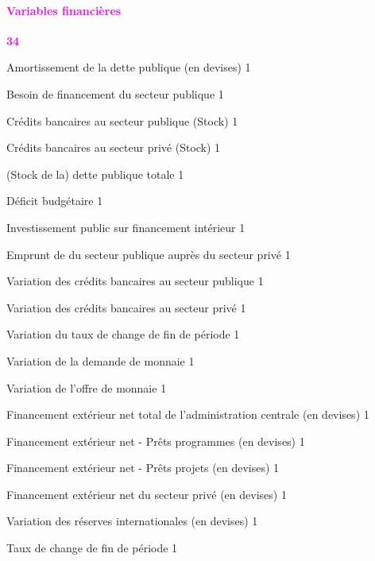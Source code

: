 \documentclass[11pt,a4paper]{article}
\newcommand{\AMORTG}{\mathit{AMORTG}}
\newcommand{\BG}{\mathit{BG}}
\newcommand{\BRG}{\mathit{BRG}}
\newcommand{\DCG}{\mathit{DCG}}
\newcommand{\DCP}{\mathit{DCP}}
\newcommand{\DEBTG}{\mathit{DEBTG}}
\newcommand{\DEFG}{\mathit{DEFG}}
\newcommand{\DINVG}{\mathit{DINVG}}
\newcommand{\ER}{\mathit{ER}}
\newcommand{\MD}{\mathit{MD}}
\newcommand{\MS}{\mathit{MS}}
\newcommand{\NFDG}{\mathit{NFDG}}
\newcommand{\NFDP}{\mathit{NFDP}}
\newcommand{\RES}{\mathit{RES}}
\newcommand{\redparagraph}[1]{\paragraph*{\large\textcolor{Fuchsia}{#1}}}
\begin{document}
	\redparagraph{Variables financières}\hfill \textcolor{Fuchsia}{\textbf{34}} 
	\begin{description}[leftmargin=!,labelwidth=\widthof{\bfseries AAAAAAAA},parsep=9.7pt]
		\item[$\AMORTG$]          Amortissement de la dette publique (en devises)	\hfill 1
		\item[$\BRG$]             Besoin de financement du secteur publique	\hfill 1
		\item[$\DCG$]             Crédits bancaires au secteur publique (Stock)	\hfill 1
		\item[$\DCP$]             Crédits bancaires au secteur privé (Stock)	\hfill 1
		\item[$\DEBTG$]           (Stock de la) dette publique totale	\hfill 1
		\item[$\DEFG$]            Déficit budgétaire	\hfill 1
		\item[$\DINVG$]           Investissement public sur financement intérieur	\hfill 1
		\item[$\Delta\BG$]            Emprunt de du secteur publique auprès du secteur privé	\hfill 1
		\item[$\Delta\DCG$]           Variation des crédits bancaires au secteur publique	\hfill 1
		\item[$\Delta\DCP$]          Variation des crédits bancaires au secteur privé	\hfill 1
		\item[$\Delta\ER$]            Variation du taux de change de fin de période	\hfill 1
		\item[$\Delta\MD$]      Variation de la demande de monnaie	\hfill 1
		\item[$\Delta\MS$]            Variation de l'offre de monnaie	\hfill 1
		\item[$\Delta\NFDG$]          Financement extérieur net total de l'administration centrale (en devises)	\hfill 1
		\item[$\Delta\NFDG^{\mathit{prg}}$]      Financement extérieur net - Prêts programmes (en devises)	\hfill 1
		\item[$\Delta\NFDG^{\mathit{prj}}$]      Financement extérieur net - Prêts projets (en devises)	\hfill 1
		\item[$\Delta\NFDP$]          Financement extérieur net du secteur privé  (en devises)	\hfill 1
		\item[$\Delta\RES$]           Variation des réserves internationales (en devises)	\hfill 1
		\item[$\ER$]              Taux de change de fin de période	\hfill 1

\end{description}
\end{document}
